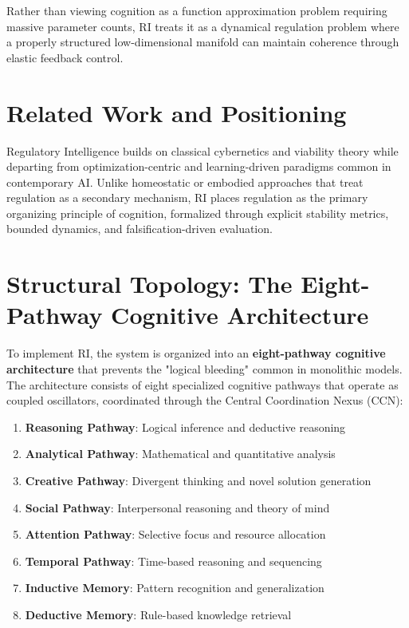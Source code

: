 \documentclass[12pt,a4paper]{report}
\begin{document}
Rather than viewing cognition as a function approximation problem requiring massive parameter counts, RI treats it as a dynamical regulation problem where a properly structured low-dimensional manifold can maintain coherence through elastic feedback control.

\section{Related Work and Positioning}

Regulatory Intelligence builds on classical cybernetics and viability theory while departing from optimization-centric and learning-driven paradigms common in contemporary AI. Unlike homeostatic or embodied approaches that treat regulation as a secondary mechanism, RI places regulation as the primary organizing principle of cognition, formalized through explicit stability metrics, bounded dynamics, and falsification-driven evaluation.

\section{Structural Topology: The Eight-Pathway Cognitive Architecture}

To implement RI, the system is organized into an \textbf{eight-pathway cognitive architecture} that prevents the "logical bleeding" common in monolithic models. The architecture consists of eight specialized cognitive pathways that operate as coupled oscillators, coordinated through the Central Coordination Nexus (CCN):

\begin{enumerate}
\item \textbf{Reasoning Pathway}: Logical inference and deductive reasoning
\item \textbf{Analytical Pathway}: Mathematical and quantitative analysis  
\item \textbf{Creative Pathway}: Divergent thinking and novel solution generation
\item \textbf{Social Pathway}: Interpersonal reasoning and theory of mind
\item \textbf{Attention Pathway}: Selective focus and resource allocation
\item \textbf{Temporal Pathway}: Time-based reasoning and sequencing
\item \textbf{Inductive Memory}: Pattern recognition and generalization
\item \textbf{Deductive Memory}: Rule-based knowledge retrieval
\end{enumerate}
\end{document}
